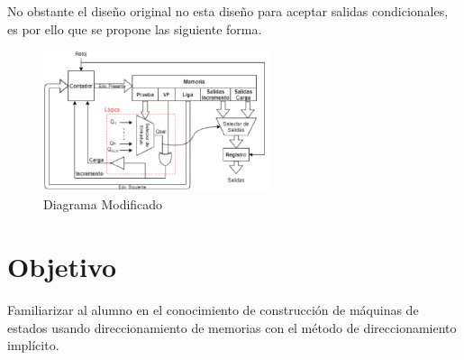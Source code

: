 \documentclass[table]{scrartcl}
\begin{document}
No obstante el diseño original no esta diseño para aceptar salidas
condicionales, es por ello que se propone las siguiente forma.
\begin{figure}[htbp]
  \centering
  \includegraphics[width=0.6\textwidth]{./img/3.png}
  \caption{Diagrama Modificado}\label{fig:3}
\end{figure}

\section{Objetivo}\label{sec:org8bfa7f0}
Familiarizar al alumno en el conocimiento de construcción de máquinas de estados
usando direccionamiento de memorias con el método de direccionamiento implícito.
\newpage{}
\end{document}

